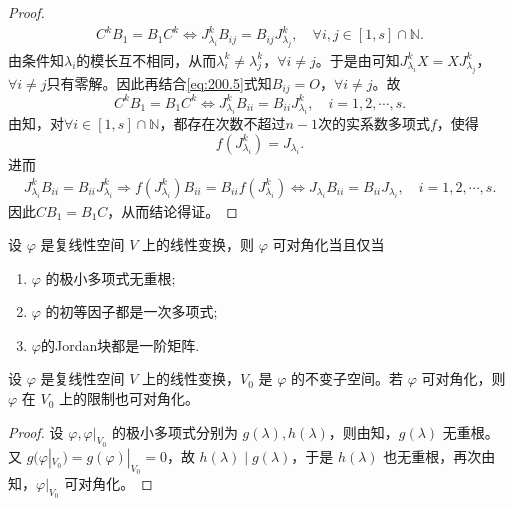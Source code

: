 \documentclass[../../main.tex]{subfiles}%
\begin{document}
\begin{proof}
\begin{align}
C^k B_1 = B_1 C^k \Longleftrightarrow J_{\lambda_i}^k B_{ij} = B_{ij} J_{\lambda_j}^k, \quad \forall i,j \in [1,s] \cap \mathbb{N}.
\label{eq:200.5}
\end{align}
由条件知$\lambda_i$的模长互不相同，从而$\lambda_i^k \ne \lambda_j^k$，$\forall i \ne j$。于是由可知$J_{\lambda_i}^k X = X J_{\lambda_j}^k$，$\forall i \ne j$只有零解。因此再结合\eqref{eq:200.5}式知$B_{ij} = O$，$\forall i \ne j$。故
\[
C^k B_1 = B_1 C^k \Longleftrightarrow J_{\lambda_i}^k B_{ii} = B_{ii} J_{\lambda_i}^k, \quad i = 1,2,\cdots,s.
\]
由知，对$\forall i \in [1,s] \cap \mathbb{N}$，都存在次数不超过$n - 1$次的实系数多项式$f$，使得
\[
f\left( J_{\lambda _i}^{k} \right) =J_{\lambda _i}.
\]
进而
\begin{align*}
J_{\lambda _i}^{k}B_{ii}=B_{ii}J_{\lambda _i}^{k}\Longrightarrow f\left( J_{\lambda _i}^{k} \right) B_{ii}=B_{ii}f\left( J_{\lambda _i}^{k} \right) \Longleftrightarrow J_{\lambda _i}B_{ii}=B_{ii}J_{\lambda _i},\quad i=1,2,\cdots ,s.
\end{align*}
因此$C B_1 = B_1 C$，从而结论得证。
\end{proof}

\begin{corollary}\label{corollary:矩阵可对角化的几何叙述}
设 $\varphi$ 是复线性空间 $V$ 上的线性变换，则 $\varphi$ 可对角化当且仅当
\begin{enumerate}
\item $\varphi$ 的极小多项式无重根;

\item $\varphi$ 的初等因子都是一次多项式;

\item $\varphi$的Jordan块都是一阶矩阵.
\end{enumerate}
\end{corollary}

\begin{corollary}\label{corollary:线性变换可对角化则其在不变子空间的限制上也可对角化}
设 $\varphi$ 是复线性空间 $V$ 上的线性变换，$V_0$ 是 $\varphi$ 的不变子空间。若 $\varphi$ 可对角化，则 $\varphi$ 在 $V_0$ 上的限制也可对角化。
\end{corollary}
\begin{proof}
设 $\varphi,\varphi|_{V_0}$ 的极小多项式分别为 $g(\lambda),h(\lambda)$，则由知，$g(\lambda)$ 无重根。又 $g(\varphi|_{V_0}) = g(\varphi)|_{V_0} = 0$，故 $h(\lambda)\mid g(\lambda)$，于是 $h(\lambda)$ 也无重根，再次由知，$\varphi|_{V_0}$ 可对角化。
\end{proof}
\end{document}
